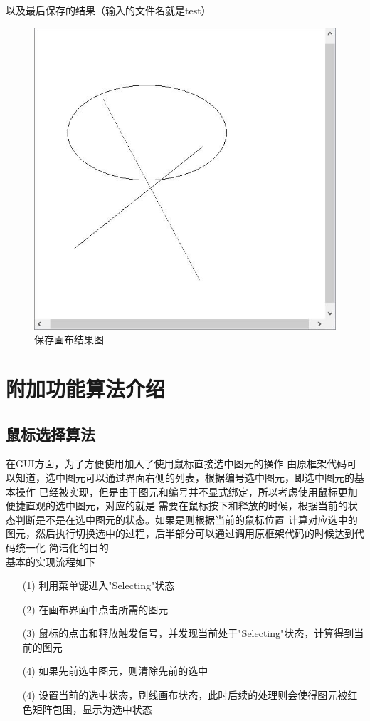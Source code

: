 \documentclass[a4paper,UTF8]{article}
\theoremstyle{definition}
\begin{document}
以及最后保存的结果（输入的文件名就是test）
\begin{figure}[h]
	\centering
	\includegraphics[scale=0.5]{figure/test.jpg}
	\caption{保存画布结果图}
	\label{fig:SaveCanvas}
\end{figure}


\section{附加功能算法介绍}
\subsection{鼠标选择算法}
在GUI方面，为了方便使用加入了使用鼠标直接选中图元的操作
由原框架代码可以知道，选中图元可以通过界面右侧的列表，根据编号选中图元，即选中图元的基本操作
已经被实现，但是由于图元和编号并不显式绑定，所以考虑使用鼠标更加便捷直观的选中图元，对应的就是
需要在鼠标按下和释放的时候，根据当前的状态判断是不是在选中图元的状态。如果是则根据当前的鼠标位置
计算对应选中的图元，然后执行切换选中的过程，后半部分可以通过调用原框架代码的时候达到代码统一化
简洁化的目的\\
基本的实现流程如下

\begin{itemize}
    \item [(1)] 
    利用菜单键进入"Selecting"状态
    \item [(2)]
    在画布界面中点击所需的图元
    \item [(3)]
    鼠标的点击和释放触发信号，并发现当前处于"Selecting"状态，计算得到当前的图元
    \item [(4)]
    如果先前选中图元，则清除先前的选中
    \item [(4)]
    设置当前的选中状态，刷线画布状态，此时后续的处理则会使得图元被红色矩阵包围，显示为选中状态
  \end{itemize}
\end{document}
